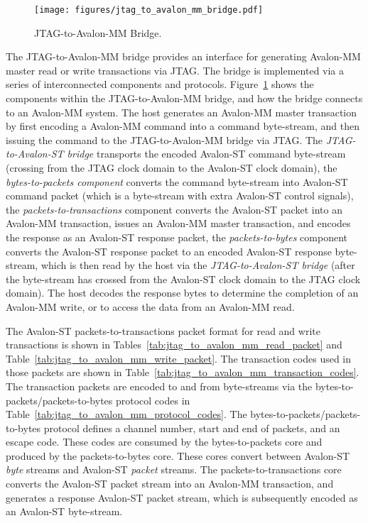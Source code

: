 \documentclass[10pt,twoside]{article}
\begin{document}
%
\begin{figure}
  \begin{center}
    \texttt{[image: figures/jtag\_to\_avalon\_mm\_bridge.pdf]}
  \end{center}
  \caption{JTAG-to-Avalon-MM Bridge.}
  \label{fig:jtag_to_avalon_mm_bridge}
\end{figure}

The JTAG-to-Avalon-MM bridge provides an interface for generating
Avalon-MM master read or write transactions via JTAG. The bridge
is implemented via a series of interconnected components and protocols.
Figure~\ref{fig:jtag_to_avalon_mm_bridge} shows the components within
the JTAG-to-Avalon-MM bridge, and how the bridge connects to an Avalon-MM system.
The host generates an Avalon-MM master transaction by first encoding
a Avalon-MM command into a command byte-stream, and then issuing the
command to the JTAG-to-Avalon-MM bridge via JTAG.
The {\em JTAG-to-Avalon-ST bridge} transports the encoded Avalon-ST command 
byte-stream (crossing from the JTAG clock domain to the Avalon-ST clock
domain), the {\em bytes-to-packets component} converts the command 
byte-stream into Avalon-ST command packet (which is a byte-stream 
with extra Avalon-ST control signals), the {\em packets-to-transactions}
component converts the Avalon-ST packet into an Avalon-MM
transaction, issues an Avalon-MM master transaction, and
encodes the response as an Avalon-ST response packet, the
{\em packets-to-bytes} component converts the Avalon-ST response packet
to an encoded Avalon-ST response byte-stream, which is then read
by the host via the {\em JTAG-to-Avalon-ST bridge}
(after the byte-stream has crossed from the Avalon-ST clock
domain to the JTAG clock domain).
The host decodes the response bytes to determine the completion of
an Avalon-MM write, or to access the data from an Avalon-MM read.

The Avalon-ST packets-to-transactions packet format for read
and write transactions is shown in 
Tables~\ref{tab:jtag_to_avalon_mm_read_packet}
and Table~\ref{tab:jtag_to_avalon_mm_write_packet}.
The transaction codes used in those packets are shown
in Table~\ref{tab:jtag_to_avalon_mm_transaction_codes}.
The transaction packets are encoded to and from byte-streams
via the bytes-to-packets/packets-to-bytes protocol
codes in Table~\ref{tab:jtag_to_avalon_mm_protocol_codes}.
The bytes-to-packets/packets-to-bytes protocol defines a channel 
number, start and end of packets, and an escape code. These
codes are consumed by the bytes-to-packets core and produced
by the packets-to-bytes core. These cores convert between
Avalon-ST {\em byte} streams and Avalon-ST {\em packet} streams.
The packets-to-transactions core converts the Avalon-ST packet
stream into an Avalon-MM transaction, and generates a response
Avalon-ST packet stream, which is subsequently encoded as an
Avalon-ST byte-stream.
\end{document}
